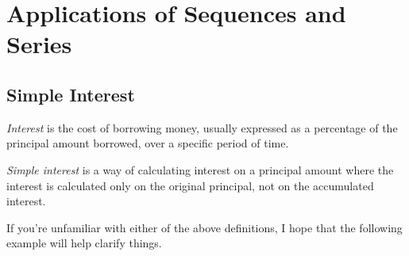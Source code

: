 \chapter{Applications of Sequences and Series}

\section{Simple Interest}

\begin{definition}[Interest]
  \textit{Interest} is the cost of borrowing money, usually expressed as a percentage of the principal amount
  borrowed, over a specific period of time.
\end{definition}

\begin{definition}
  \textit{Simple interest} is a way of calculating interest on a principal amount
  where the interest is calculated only on the original principal, not on the accumulated interest.
\end{definition}

If you're unfamiliar with either of the above definitions, I hope that 
the following example will help clarify things. 

